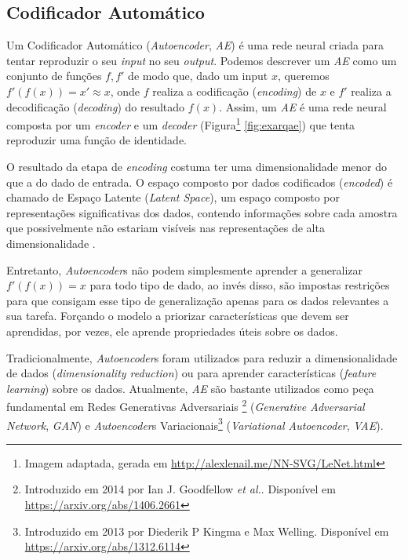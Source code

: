 \subsection{Codificador Automático}

Um Codificador Automático (\textit{Autoencoder}, \textit{AE}) é uma rede neural criada para tentar reproduzir o seu \textit{input} no seu \textit{output}. Podemos descrever um \textit{AE} como um conjunto de funções $f, f'$ de modo que, dado um input $x$, queremos $f'(f(x)) = x' \approx x$, onde $f$ realiza a codificação (\textit{encoding}) de $x$ e $f'$ realiza a decodificação (\textit{decoding}) do resultado $f(x)$. Assim, um \textit{AE} é uma rede neural composta por um \textit{encoder} e um \textit{decoder} (Figura\footnote{Imagem adaptada, gerada em \url{http://alexlenail.me/NN-SVG/LeNet.html}} \ref{fig:exarqae}) que tenta reproduzir uma função de identidade.

O resultado da etapa de \textit{encoding} costuma ter uma dimensionalidade menor do que a do dado de entrada. O espaço composto por dados codificados (\textit{encoded}) é chamado de Espaço Latente (\textit{Latent Space}), um espaço composto por representações significativas dos dados, contendo informações sobre cada amostra que possivelmente não estariam visíveis nas representações de alta dimensionalidade \cite{60}.

Entretanto, \textit{Autoencoder}s não podem simplesmente aprender a generalizar $f'(f(x)) = x$ para todo tipo de dado, ao invés disso, são impostas restrições para que consigam esse tipo de generalização apenas para os dados relevantes a sua tarefa. Forçando o modelo a priorizar características que devem ser aprendidas, por vezes, ele aprende propriedades úteis sobre os dados.

Tradicionalmente, \textit{Autoencoder}s foram utilizados para reduzir a dimensionalidade de dados (\textit{dimensionality reduction}) ou para aprender características (\textit{feature learning}) sobre os dados. Atualmente, \textit{AE} são bastante utilizados como peça fundamental em Redes Generativas Adversariais \footnote{Introduzido em 2014 por Ian J. Goodfellow \textit{et al.}. Disponível em \url{https://arxiv.org/abs/1406.2661}} (\textit{Generative Adversarial Network}, \textit{GAN}) e \textit{Autoencoder}s Variacionais\footnote{Introduzido em 2013 por Diederik P Kingma e Max Welling. Disponível em \url{https://arxiv.org/abs/1312.6114}} (\textit{Variational Autoencoder}, \textit{VAE}).

